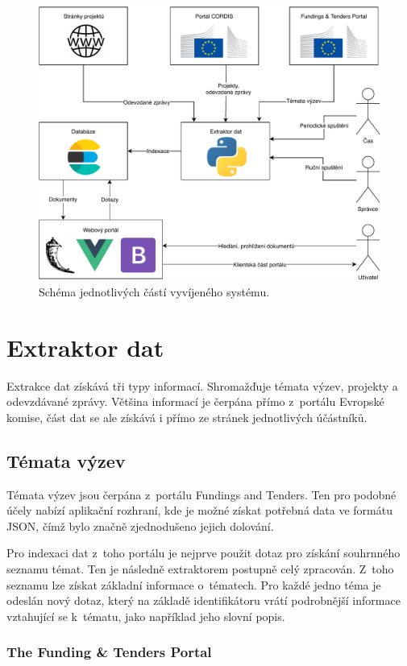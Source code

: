 \begin{figure}[H]
	\centering
	\includegraphics[width=\textwidth]{obrazky-figures/my-scheme.pdf}
	\caption{Schéma jednotlivých částí vyvíjeného systému.}
	\label{img:scheme}
\end{figure}

\section{Extraktor dat}
Extrakce dat získává tři typy informací. Shromažďuje témata výzev, projekty a odevzdávané zprávy. Většina informací je čerpána přímo z~portálu Evropské komise, část dat se ale získává i přímo ze stránek jednotlivých účástníků.

\subsection{Témata výzev}
Témata výzev jsou čerpána z~portálu Fundings and Tenders.
Ten pro podobné účely nabízí aplikační rozhraní, kde je možné získat potřebná data ve formátu JSON, čímž bylo značně zjednodušeno jejich dolování. 

Pro indexaci dat z~toho portálu je nejprve použit dotaz pro získání souhrnného seznamu témat. Ten je následně extraktorem postupně celý zpracován. Z~toho seznamu lze získat základní informace o~tématech. Pro každé jedno téma je odeslán nový dotaz, který na základě identifikátoru vrátí podrobnější informace vztahující se k~tématu, jako například jeho slovní popis.

\subsubsection*{The Funding \& Tenders Portal}\label{section:funding}

